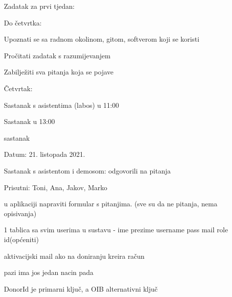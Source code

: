 \begin{packed_enum}
\begin{packed_item}
		    	\item Zadatak za prvi tjedan:
		    	\item[] \begin{packed_item}
		            \item Do četvrtka:
                	\begin{packed_item}
	                    \item Upoznati se sa radnom okolinom, gitom, softverom koji se koristi
	                    \item Pročitati zadatak s razumijevanjem
	                    \item Zabilježiti sva pitanja koja se pojave	
	                \end{packed_item}
                    \item Četvrtak:
                    \item[] \begin{packed_item}
	                    \item Sastanak s asistentima (labos) u 11:00
	                    \item Sastanak u 13:00
	                \end{packed_item}      
                \end{packed_item}
			\end{packed_item}
			
			\bigskip
			\item sastanak
			\item[] \begin{packed_item}
				\item Datum: 21. listopada 2021.
		        \item Sastanak s asistentom i demosom: odgovorili na pitanja
		        \item[] \begin{packed_item}
    		        \item Prisutni: Toni, Ana, Jakov, Marko
    		        \item u aplikaciji napraviti formular s pitanjima. (sve su da ne pitanja, nema opisivanja)
    		        \item 1 tablica sa svim userima u sustavu - ime prezime username pass mail role id(općeniti)
    		        \item aktivacijski mail ako na doniranju kreira račun
    		        \item *pazi ima jos jedan nacin pada
    		        \item DonorId je primarni ključ, a OIB alternativni ključ
		        \end{packed_item}
		        

\end{packed_item}
\end{packed_enum}
